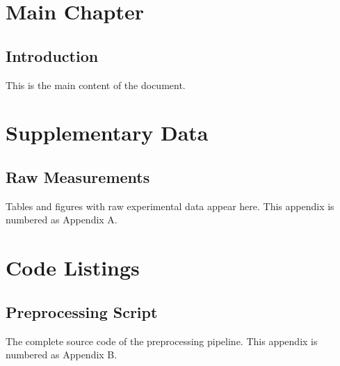 \documentclass[12pt, a4paper]{report}
\begin{document}
\chapter{Main Chapter}
\section{Introduction}
This is the main content of the document.

\appendix

\chapter{Supplementary Data}
\section{Raw Measurements}
Tables and figures with raw experimental data
appear here. This appendix is numbered as
Appendix A.

\chapter{Code Listings}
\section{Preprocessing Script}
The complete source code of the preprocessing
pipeline. This appendix is numbered as
Appendix B.
\end{document}
